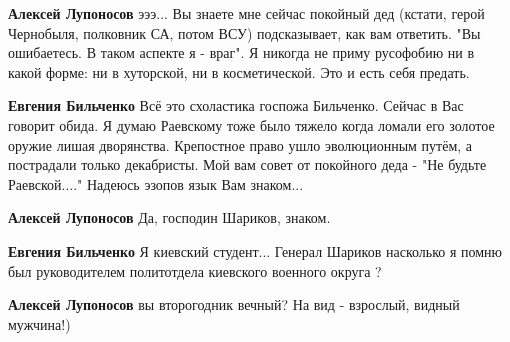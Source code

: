 \begin{itemize}
\begin{itemize}
 
\textbf{Алексей Лупоносов} эээ... Вы знаете мне сейчас покойный дед (кстати, герой Чернобыля, полковник СА, потом ВСУ) подсказывает, как вам ответить. "Вы ошибаетесь. В таком аспекте я - враг". Я никогда не приму русофобию ни в какой форме: ни в хуторской, ни в косметической. Это и есть себя предать.

 
\textbf{Евгения Бильченко} Всё это схоластика госпожа Бильченко. Сейчас в Вас говорит обида. Я думаю Раевскому тоже было тяжело когда ломали его золотое оружие лишая дворянства. Крепостное право ушло эволюционным путём, а пострадали только декабристы. Мой вам совет от покойного деда - "Не будьте Раевской...." Надеюсь эзопов язык Вам знаком...

 
\textbf{Алексей Лупоносов} Да, господин Шариков, знаком.

 
\textbf{Евгения Бильченко} Я киевский студент... Генерал Шариков насколько я помню был руководителем политотдела киевского военного округа ?

 
\textbf{Алексей Лупоносов} вы второгодник вечный? На вид - взрослый, видный мужчина!)

 

\end{itemize}
\end{itemize}

